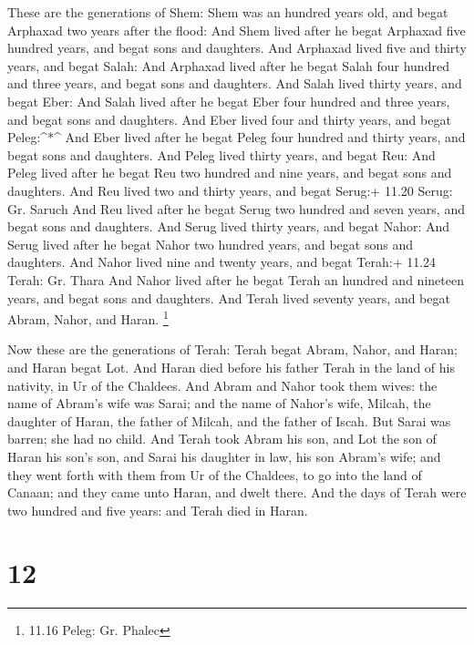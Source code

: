 These are the generations of Shem: Shem was an hundred
years old, and begat Arphaxad two years after the flood: 
And Shem lived after he begat Arphaxad five hundred years, and begat
sons and daughters.  And Arphaxad lived five and thirty
years, and begat Salah:  And Arphaxad lived after he begat
Salah four hundred and three years, and begat sons and daughters.
 And Salah lived thirty years, and begat Eber:
 And Salah lived after he begat Eber four hundred and three
years, and begat sons and daughters.  And Eber lived four
and thirty years, and begat Peleg:\^{}*\^{}  And Eber lived
after he begat Peleg four hundred and thirty years, and begat sons and
daughters.  And Peleg lived thirty years, and begat Reu:
 And Peleg lived after he begat Reu two hundred and nine
years, and begat sons and daughters.  And Reu lived two and
thirty years, and begat Serug:+ 11.20 Serug: Gr. Saruch 
And Reu lived after he begat Serug two hundred and seven years, and
begat sons and daughters.  And Serug lived thirty years,
and begat Nahor:  And Serug lived after he begat Nahor two
hundred years, and begat sons and daughters.  And Nahor
lived nine and twenty years, and begat Terah:+ 11.24 Terah: Gr. Thara
 And Nahor lived after he begat Terah an hundred and
nineteen years, and begat sons and daughters.  And Terah
lived seventy years, and begat Abram, Nahor, and Haran. \footnote{11.16
  Peleg: Gr. Phalec}

 Now these are the generations of Terah: Terah begat Abram,
Nahor, and Haran; and Haran begat Lot.  And Haran died
before his father Terah in the land of his nativity, in Ur of the
Chaldees.  And Abram and Nahor took them wives: the name of
Abram's wife was Sarai; and the name of Nahor's wife, Milcah, the
daughter of Haran, the father of Milcah, and the father of Iscah.
 But Sarai was barren; she had no child.  And
Terah took Abram his son, and Lot the son of Haran his son's son, and
Sarai his daughter in law, his son Abram's wife; and they went forth
with them from Ur of the Chaldees, to go into the land of Canaan; and
they came unto Haran, and dwelt there.  And the days of
Terah were two hundred and five years: and Terah died in Haran.

\hypertarget{section-11}{%
\section{12}\label{section-11}}

